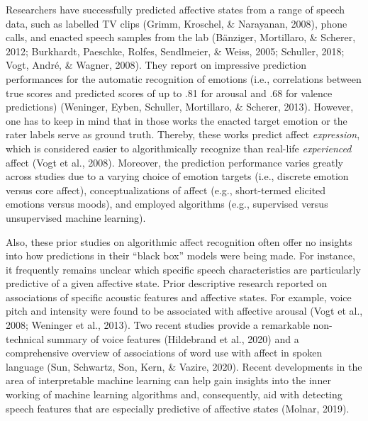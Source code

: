 \documentclass[
  man,floatsintext]{apa6}
\begin{document}
Researchers have successfully predicted affective states from a range of speech data, such as labelled TV clips (Grimm, Kroschel, \& Narayanan, 2008), phone calls, and enacted speech samples from the lab (Bänziger, Mortillaro, \& Scherer, 2012; Burkhardt, Paeschke, Rolfes, Sendlmeier, \& Weiss, 2005; Schuller, 2018; Vogt, André, \& Wagner, 2008). They report on impressive prediction performances for the automatic recognition of emotions (i.e., correlations between true scores and predicted scores of up to .81 for arousal and .68 for valence predictions) (Weninger, Eyben, Schuller, Mortillaro, \& Scherer, 2013). However, one has to keep in mind that in those works the enacted target emotion or the rater labels serve as ground truth. Thereby, these works predict affect \emph{expression}, which is considered easier to algorithmically recognize than real-life \emph{experienced} affect (Vogt et al., 2008). Moreover, the prediction performance varies greatly across studies due to a varying choice of emotion targets (i.e., discrete emotion versus core affect), conceptualizations of affect (e.g., short-termed elicited emotions versus moods), and employed algorithms (e.g., supervised versus unsupervised machine learning).

Also, these prior studies on algorithmic affect recognition often offer no insights into how predictions in their ``black box'' models were being made. For instance, it frequently remains unclear which specific speech characteristics are particularly predictive of a given affective state. Prior descriptive research reported on associations of specific acoustic features and affective states. For example, voice pitch and intensity were found to be associated with affective arousal (Vogt et al., 2008; Weninger et al., 2013). Two recent studies provide a remarkable non-technical summary of voice features (Hildebrand et al., 2020) and a comprehensive overview of associations of word use with affect in spoken language (Sun, Schwartz, Son, Kern, \& Vazire, 2020). Recent developments in the area of interpretable machine learning can help gain insights into the inner working of machine learning algorithms and, consequently, aid with detecting speech features that are especially predictive of affective states (Molnar, 2019).
\end{document}
